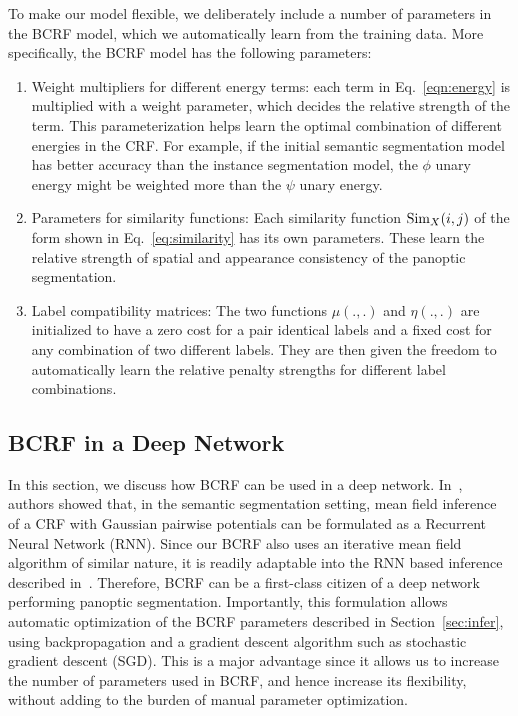 To make our model flexible, we deliberately include a number of parameters in the BCRF model, which we automatically learn from the training data. More specifically, the BCRF model has the following parameters:
\begin{enumerate}
	\item Weight multipliers for different energy terms: each term in Eq.~\eqref{eqn:energy} is multiplied with a weight parameter, which decides the relative strength of the term. This parameterization helps learn the optimal combination of different energies in the CRF. For example, if the initial semantic segmentation model has better accuracy than the instance segmentation model, the $\phi$ unary energy might be weighted more than the $\psi$ unary energy.
	
	\item Parameters for similarity functions: Each similarity function $\operatorname{Sim}_X(i, j)$ of the form shown in Eq.~\eqref{eq:similarity} has its own parameters. These learn the relative strength of spatial and appearance consistency of the panoptic segmentation.
	
	\item Label compatibility matrices: The two functions $\mu(., .)$ and $\eta(., .)$ are initialized to have a zero cost for a pair identical labels and a fixed cost for any combination of two different labels. They are then given the freedom to automatically learn the relative penalty strengths for different label combinations.
\end{enumerate}



\subsection{BCRF in a Deep Network}
In this section, we discuss how BCRF can be used in a deep network. In~\cite{Zhen_ICCV15_CRFRNN}, authors showed that, in the semantic segmentation setting, mean field inference of a CRF with Gaussian pairwise potentials can be formulated as a Recurrent Neural Network (RNN). Since our BCRF also uses an iterative mean field algorithm of similar nature, it is readily adaptable into the RNN based inference described in~\cite{Zhen_ICCV15_CRFRNN}. Therefore, BCRF can be a first-class citizen of a deep network performing panoptic segmentation. Importantly, this formulation allows automatic optimization of the BCRF parameters described in Section~\ref{sec:infer}, using backpropagation and a gradient descent algorithm such as stochastic gradient descent (SGD). This is a major advantage since it allows us to increase the number of parameters used in BCRF, and hence increase its flexibility, without adding to the burden of manual parameter optimization.

